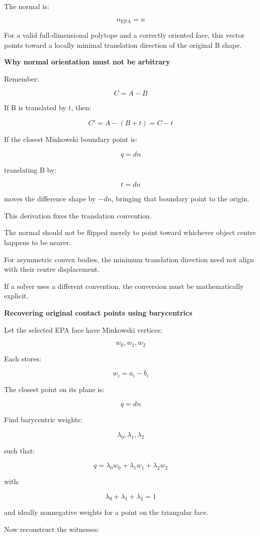 The normal is:

\[
\boxed{n_{\mathrm{EPA}}=n}
\]

For a valid full-dimensional polytope and a correctly oriented face, this vector points toward a locally minimal translation direction of the original B shape.

\textbf{Why normal orientation must not be arbitrary}

Remember:

\[
C=A-B
\]

If B is translated by \(t\), then:

\[
C'=A-(B+t)=C-t
\]

If the closest Minkowski boundary point is:

\[
q=dn
\]

translating B by:

\[
t=dn
\]

moves the difference shape by \(-dn\), bringing that boundary point to the origin.

This derivation fixes the translation convention.

The normal should not be flipped merely to point toward whichever object centre happens to be nearer.

For asymmetric convex bodies, the minimum translation direction need not align with their centre displacement.

If a solver uses a different convention, the conversion must be mathematically explicit.

\textbf{Recovering original contact points using barycentrics}

Let the selected EPA face have Minkowski vertices:

\[
w_0,w_1,w_2
\]

Each stores:

\[
w_i=a_i-b_i
\]

The closest point on its plane is:

\[
q=dn
\]

Find barycentric weights:

\[
\lambda_0,\lambda_1,\lambda_2
\]

such that:

\[
\boxed{ q=\lambda_0w_0+\lambda_1w_1+\lambda_2w_2 }
\]

with:

\[
\lambda_0+\lambda_1+\lambda_2=1
\]

and ideally nonnegative weights for a point on the triangular face.

Now reconstruct the witnesses:

